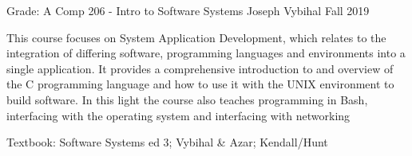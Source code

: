 \begin{cventries}
    \cventry
    {Grade: A} %
    {Comp 206 - Intro to Software Systems} %
    {Joseph Vybihal} %
    {Fall 2019} %
    {
      \begin{cvitems} %
      \item {This course focuses on System Application Development, which relates to the integration of differing software, programming languages and environments into a single application. It provides a comprehensive introduction to and overview of the C programming language and how to use it with the UNIX environment to build software. In this light the course also teaches programming in Bash, interfacing with the operating system and interfacing with networking}
      \item {Textbook: Software Systems ed 3; Vybihal \& Azar; Kendall/Hunt}
      \end{cvitems}
    }

\end{cventries}


